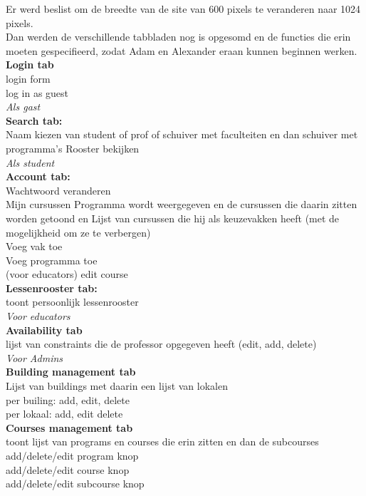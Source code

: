 \documentclass{article}
\begin{document}
Er werd beslist om de breedte van de site van 600 pixels te veranderen naar 1024 pixels. \\
Dan werden de verschillende tabbladen nog is opgesomd en de functies die erin moeten gespecifieerd, zodat Adam en Alexander eraan kunnen beginnen werken. \\[3mm]

\textbf{Login tab }\\
login form \\
log in as guest \\

\textit{Als gast  } \\
\textbf{Search tab: } \\
Naam kiezen van student of prof of schuiver met faculteiten en dan schuiver met programma's  Rooster bekijken \\

\textit{Als student  } \\
\textbf{Account tab: } \\
Wachtwoord veranderen \\
Mijn cursussen Programma wordt weergegeven en de cursussen die daarin zitten worden getoond en Lijst van cursussen die hij als keuzevakken heeft (met de mogelijkheid om ze te verbergen) \\
Voeg vak toe \\
Voeg programma toe \\
(voor educators) edit course \\

\textbf{Lessenrooster tab: } \\
toont persoonlijk lessenrooster \\

\textit{Voor educators  } \\
\textbf{Availability tab } \\
lijst van constraints die de professor opgegeven heeft (edit, add, delete) \\

\textit{Voor Admins  } \\
\textbf{Building management tab } \\
Lijst van buildings met daarin een lijst van lokalen \\
per builing: add, edit, delete \\
per lokaal: add, edit delete \\

\textbf{Courses management tab } \\
toont lijst van programs en courses die erin zitten en dan de subcourses \\
add/delete/edit program knop \\
add/delete/edit course knop \\
add/delete/edit subcourse knop \\ 
\end{document}
